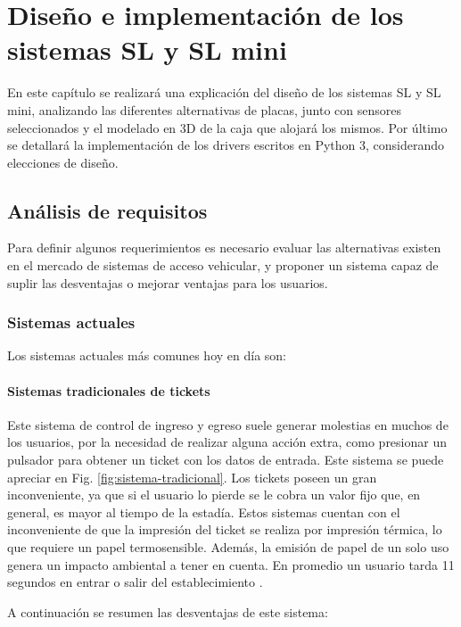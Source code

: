 \chapter{Diseño e implementación de los sistemas SL y SL mini}

En este capítulo se realizará una explicación del diseño de los sistemas SL y SL mini, analizando las diferentes alternativas de placas, junto con sensores seleccionados y el modelado en 3D de la caja que alojará los mismos. Por último se detallará la implementación de los drivers escritos en Python 3, considerando elecciones de diseño.

\section{Análisis de requisitos}

Para definir algunos requerimientos es necesario evaluar las alternativas existen en el mercado de sistemas de acceso vehicular, y proponer un sistema capaz de suplir las desventajas o mejorar ventajas para los usuarios.

\subsection{Sistemas actuales}

Los sistemas actuales más comunes hoy en día son:

\subsubsection{Sistemas tradicionales de tickets}

Este sistema de control de ingreso y egreso suele generar molestias en muchos de los usuarios, por la necesidad de realizar alguna acción extra, como presionar un pulsador para obtener un ticket con los datos de entrada. Este sistema se puede apreciar en Fig. \ref{fig:sistema-tradicional}.
Los tickets poseen un gran inconveniente, ya que si el usuario lo pierde se le cobra un valor fijo que, en general, es mayor al tiempo de la estadía.
Estos sistemas cuentan con el inconveniente de que la impresión del ticket se realiza por impresión térmica, lo que requiere un papel termosensible.
Además, la emisión de papel de un solo uso genera un impacto ambiental a tener en cuenta.
En promedio un usuario tarda 11 segundos en entrar o salir del establecimiento \cite{casadomo_sistema_2015}.

A continuación se resumen las desventajas de este sistema:

